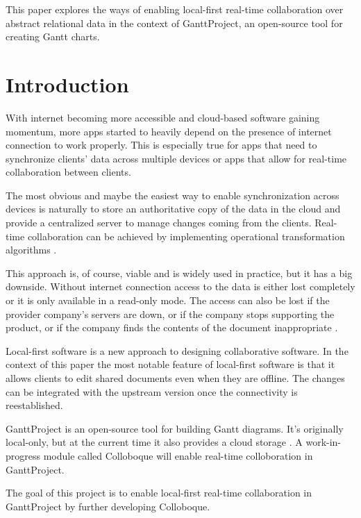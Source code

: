 \documentclass[a4paper, 11pt, oneside]{article}
\theoremstyle{definition}
\begin{document}
This paper explores the ways of enabling local-first real-time collaboration over abstract relational data in the context of GanttProject, an open-source tool for creating Gantt charts.
\newpage
\tableofcontents

\clearpage
{}

\section{Introduction}

With internet becoming more accessible and cloud-based software gaining momentum, more apps started to heavily depend on the presence of internet connection to work properly. This is especially true for apps that need to synchronize clients' data across multiple devices or apps that allow for real-time collaboration between clients.

The most obvious and maybe the easiest way to enable synchronization across devices is naturally to store an authoritative copy of the data in the cloud and provide a centralized server to manage changes coming from the clients. Real-time collaboration can be achieved by implementing operational transformation algorithms \cite{ot}.

This approach is, of course, viable and is widely used in practice, but it has a big downside. Without internet connection access to the data is either lost completely or it is only available in a read-only mode. The access can also be lost if the provider company's servers are down, or if the company stops supporting the product, or if the company finds the contents of the document inappropriate \cite{googleblock}. 

Local-first software \cite{localfirst} is a new approach to designing collaborative software. In the context of this paper the most notable feature of local-first software is that it allows clients to edit shared documents even when they are offline. The changes can be integrated with the upstream version once the connectivity is reestablished.

GanttProject \cite{ganttsite,ganttrepo} is an open-source tool for building Gantt diagrams. It's originally local-only, but at the current time it also provides a cloud storage \cite{ganttcloudsite}. A work-in-progress module called Colloboque will enable real-time colloboration in GanttProject.

The goal of this project is to enable local-first real-time collaboration in GanttProject by further developing Colloboque.
\end{document}
